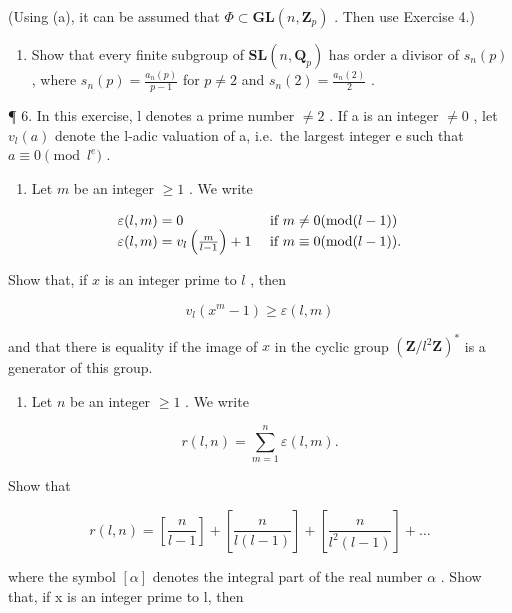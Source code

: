 (Using (a), it can be assumed that \(\Phi \subset \mathbf{GL}(n, \mathbf{Z}_p)\) . Then use Exercise 4.)

\begin{enumerate}
\def\labelenumi{(\alph{enumi})}
\setcounter{enumi}{3}
\tightlist
\item
  Show that every finite subgroup of \(\mathbf{SL}(n, \mathbf{Q}_p)\) has order a divisor of \(s_n(p)\) , where \(s_n(p) = \frac{a_n(p)}{p - 1}\) for \(p \neq 2\) and \(s_n(2) = \frac{a_n(2)}{2}\) .
\end{enumerate}

¶ 6. In this exercise, l denotes a prime number \(\neq2\) . If a is an integer \(\neq0\) , let \(v_{l}(a)\) denote the l-adic valuation of a, i.e.~the largest integer e such that \(a\equiv0\pmod{l^{e}}\) .

\begin{enumerate}
\def\labelenumi{(\alph{enumi})}
\tightlist
\item
  Let \(m\) be an integer \(\geqslant 1\) . We write
\end{enumerate}

\[
\begin{array}{l l} \varepsilon (l, m) = 0 & \text { if } m \neq 0 (\mathrm{mod} (l - 1)) \\ \varepsilon (l, m) = v _ {l} \left(\frac {m}{l - 1}\right) + 1 & \text { if } m \equiv 0 (\mathrm{mod} (l - 1)). \end{array}
\]

Show that, if \(x\) is an integer prime to \(l\) , then

\[
v _ {l} (x ^ {m} - 1) \geqslant \varepsilon (l, m)
\]

and that there is equality if the image of \(x\) in the cyclic group \((\mathbf{Z} / l^2\mathbf{Z})^*\) is a generator of this group.

\begin{enumerate}
\def\labelenumi{(\alph{enumi})}
\setcounter{enumi}{1}
\tightlist
\item
  Let \(n\) be an integer \(\geqslant 1\) . We write
\end{enumerate}

\[
r (l, n) = \sum_ {m = 1} ^ {n} \varepsilon (l, m).
\]

Show that

\[
r (l, n) = \left[ \frac {n}{l - 1} \right] + \left[ \frac {n}{l (l - 1)} \right] + \left[ \frac {n}{l ^ {2} (l - 1)} \right] + \dots
\]

where the symbol \([\alpha]\) denotes the integral part of the real number \(\alpha\) . Show that, if x is an integer prime to l, then


